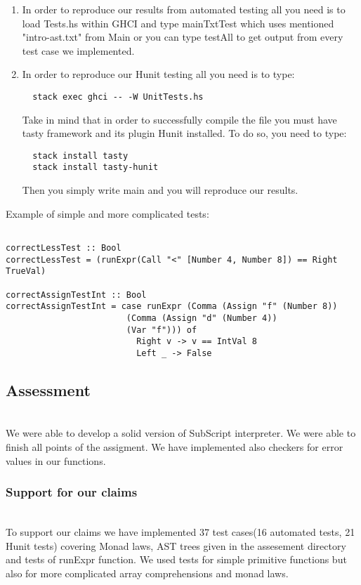 \documentclass[11pt]{article}
\begin{document}
\begin{enumerate}

\item In order to reproduce our results from automated testing all you need is to load Tests.hs within GHCI and type mainTxtTest which uses mentioned "intro-ast.txt" from Main or you can type testAll to get output from every test case we implemented.\\

  \item In order to reproduce our Hunit testing all you need is to type:
  \begin{verbatim}
  stack exec ghci -- -W UnitTests.hs
  \end{verbatim}
  Take in mind that in order to successfully compile the file you must have tasty framework and its plugin Hunit installed. To do so, you need to type:
  \begin{verbatim}
  stack install tasty
  stack install tasty-hunit
  \end{verbatim}
  Then you simply write main and you will reproduce our results.\\
\end{enumerate}

Example of simple and more complicated tests:
\begin{verbatim}

correctLessTest :: Bool
correctLessTest = (runExpr(Call "<" [Number 4, Number 8]) == Right TrueVal)	

correctAssignTestInt :: Bool
correctAssignTestInt = case runExpr (Comma (Assign "f" (Number 8))
                        (Comma (Assign "d" (Number 4))
                        (Var "f"))) of
                          Right v -> v == IntVal 8
                          Left _ -> False

\end{verbatim} 


\subsection{Assessment}\\
We were able to develop a solid version of SubScript interpreter. We were able to finish all points of the assigment. We have implemented also checkers for error values in our functions. 
\subsubsection{Support for our claims}\\
To support our claims we have implemented 37 test cases(16 automated tests, 21 Hunit tests) covering Monad laws, AST trees given in the assesement directory and tests of runExpr function. 
  We used tests for simple primitive functions but also for more complicated array comprehensions and monad laws. 
\end{document}
